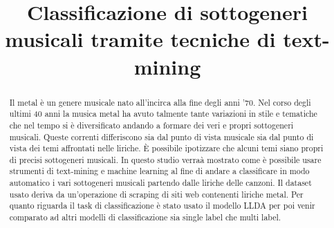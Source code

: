 \documentclass[technote]{IEEEtran}
\begin{document}
\title{Classificazione di sottogeneri musicali tramite tecniche di text-mining}

\author{
\and
{}
\and
{}
}
\maketitle

\begin{abstract}
Il metal \`e un genere musicale nato all’incirca
alla fine degli anni ’70. Nel corso degli ultimi 40 anni la musica
metal ha avuto talmente tante variazioni in stile e tematiche
che nel tempo si \`e diversificato andando a formare dei veri e
propri sottogeneri musicali. Queste correnti differiscono sia dal
punto di vista musicale sia dal punto di vista dei temi affrontati
nelle liriche. \`E possibile ipotizzare che alcuni temi siano propri di
precisi sottogeneri musicali. In questo studio verra\`a mostrato come
\`e possibile usare strumenti di text-mining e machine learning al
fine di andare a classificare in modo automatico i vari sottogeneri
musicali partendo dalle liriche delle canzoni. Il dataset usato
deriva da un’operazione di scraping di siti web contenenti liriche
metal. Per quanto riguarda il task di classificazione \`e stato usato
il modello LLDA per poi venir comparato ad altri modelli di classificazione sia 
single label che multi label.
\end{abstract}
\end{document}
